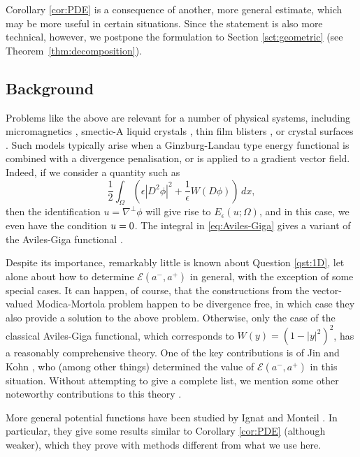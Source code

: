 \documentclass[a4paper]{article}
\let\div\relax\DeclareMathOperator{\div}{div}
\theoremstyle{definition}
\theoremstyle{remark}
\begin{document}
Corollary \ref{cor:PDE} is a consequence of another, more general estimate, which may be more
useful in certain situations. Since the statement is also more technical, however, we postpone
the formulation to Section \ref{sct:geometric} (see Theorem~\ref{thm:decomposition}).




\subsection{Background}

Problems like the above are relevant for a number of physical systems, including micromagnetics
\cite{Hubert-Schaefer:98}, smectic-A liquid crystals \cite{Kleman-Parodi:75, Aviles-Giga:87}, thin film blisters
\cite{Ortiz-Gioia:94}, or crystal surfaces \cite{Stewart-Goldenfeld:92}. Such models typically
arise when a Ginzburg-Landau type energy functional is combined with a divergence penalisation,
or is applied to a gradient vector field. Indeed, if we consider a quantity such as
\begin{equation} \label{eq:Aviles-Giga}
\frac{1}{2} \int_\Omega \left(\epsilon |D^2 \phi|^2 + \frac{1}{\epsilon} W(D\phi)\right) \, dx,
\end{equation}
then the identification $u = \nabla^\perp \phi$ will give rise to $E_\epsilon(u; \Omega)$, and
in this case, we even have the condition $\div u = 0$. The integral in \eqref{eq:Aviles-Giga} gives a variant
of the Aviles-Giga functional \cite{Aviles-Giga:87}.

Despite its importance, remarkably little is known about Question \ref{qst:1D}, let alone about
how to determine $\mathcal{E}(a^-, a^+)$ in general, with the exception of some special cases.
It can happen, of course, that the constructions from the vector-valued Modica-Mortola problem
\cite{Sternberg:88, Baldo:90} happen to be divergence free, in which case they also provide a solution to
the above problem. Otherwise, only the case of the classical Aviles-Giga functional, which corresponds to
$W(y) = (1 - |y|^2)^2$, has a reasonably comprehensive theory. One of the key contributions is
of Jin and Kohn \cite{Jin-Kohn:00}, who (among other things) determined the value of $\mathcal{E}(a^-, a^+)$
in this situation. Without attempting to give a complete list, we mention some
other noteworthy contributions to this theory
\cite{Ambrosio-DeLellis-Mantegazza:99, DeSimone-Kohn-Mueller-Otto:01, Jabin-Perthame:01, Jabin-Otto-Perthame:02}.

More general potential functions have been studied by Ignat and Monteil \cite{Ignat-Monteil:20}.
In particular, they give some results similar to Corollary \ref{cor:PDE} (although weaker), which they
prove with methods different from what we use here.
\end{document}
